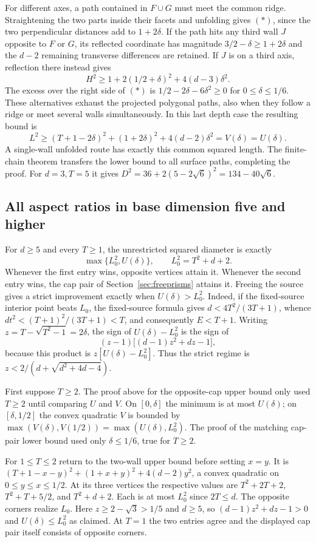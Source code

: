 \documentclass[10pt,letterpaper]{article}
\begin{document}
For different axes, a path contained in $F\cup G$ must meet the
common ridge. Straightening the two parts inside their facets and
unfolding gives $(*)$, since the two perpendicular distances add
to $1+2\delta$. If the path hits any third wall $J$ opposite to
$F$ or $G$, its reflected coordinate has magnitude $3/2-\delta
\ge1+2\delta$ and the $d-2$ remaining transverse differences are
retained. If $J$ is on a third axis, reflection there instead gives
\[
 H^2\ge1+2(1/2+\delta)^2+4(d-3)\delta^2 .
\]
The excess over the right side of $(*)$ is
$1/2-2\delta-6\delta^2\ge0$ for $0\le\delta\le1/6$.
These alternatives exhaust the projected polygonal paths, also when
they follow a ridge or meet several walls simultaneously. In this
last depth case the resulting bound is
\[
 L^2\ge (T+1-2\delta)^2+(1+2\delta)^2+4(d-2)\delta^2
       =V(\delta)=U(\delta).
\]
A single-wall unfolded route has exactly this common squared length.
The finite-chain theorem transfers the lower bound to all surface paths,
completing the proof. For $d=3,T=5$ it gives
$D^2=36+2(5-2\sqrt6)^2=134-40\sqrt6$.


\subsection{All aspect ratios in base dimension five and higher}
For $d\ge5$ and every $T\ge1$, the unrestricted squared diameter is exactly
\[
 \max\{L_0^2,U(\delta)\},\qquad L_0^2=T^2+d+2 .
\]
Whenever the first entry wins, opposite vertices attain it. Whenever the
second entry wins, the cap pair of Section~\ref{sec:freeprisms} attains it. Freeing the source gives a
strict improvement exactly when $U(\delta)>L_0^2$. Indeed, if the
fixed-source interior point beats $L_0$, the fixed-source formula gives
$d<4T^2/(3T+1)$, whence $dt^2<(T+1)^2/(3T+1)<T$, and consequently
$E<T+1$. Writing $z=T-\sqrt{T^2-1}=2\delta$, the sign of
$U(\delta)-L_0^2$ is the sign of
\[
 (z-1)\big[(d-1)z^2+dz-1\big],
\]
because this product is $z[U(\delta)-L_0^2]$. Thus the strict regime
is $z<2/(d+\sqrt{d^2+4d-4})$.

First suppose $T\ge2$. The proof above for the opposite-cap upper bound only used $T\ge2$
until comparing $U$ and $V$. On $[0,\delta]$ the minimum is at most
$U(\delta)$; on $[\delta,1/2]$ the convex quadratic $V$ is bounded by
$\max(V(\delta),V(1/2))=\max(U(\delta),L_0^2)$. The proof of the
matching cap-pair lower bound used only $\delta\le1/6$, true for
$T\ge2$.

For $1\le T\le2$ return to the two-wall upper bound before setting
$x=y$. It is
$(T+1-x-y)^2+(1+x+y)^2+4(d-2)y^2$, a convex quadratic on
$0\le y\le x\le1/2$. At its three vertices the respective values are
$T^2+2T+2$, $T^2+T+5/2$, and $T^2+d+2$. Each is at most $L_0^2$
since $2T\le d$. The opposite corners realize $L_0$. Here
$z\ge2-\sqrt3>1/5$ and $d\ge5$, so $(d-1)z^2+dz-1>0$ and
$U(\delta)\le L_0^2$ as claimed. At $T=1$ the two entries agree
and the displayed cap pair itself consists of opposite corners.
\end{document}
